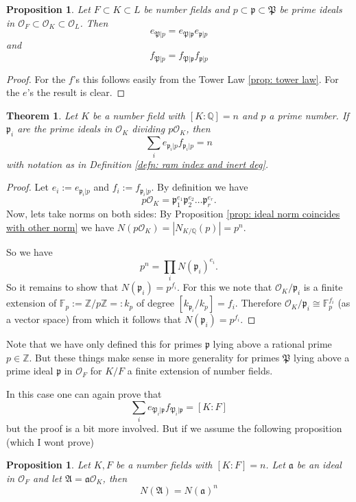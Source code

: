 \documentclass[11pt,a4paper]{report}
\theoremstyle{plain}
\newtheorem{thm}[subsection]{Theorem}
\newtheorem{prop}[subsection]{Proposition}
\theoremstyle{definition}
\theoremstyle{definition}
\newcommand{\ZZ}{\mathbb{Z}}
\def\FF{\mathbb{F}}
\def\QQ{\mathbb{Q}}
\def \gothP{\mathfrak{P}}
\def\gothp{\mathfrak{p}}
\def \OO {\mathcal{O}}
\def\gotha{\mathfrak{a}}
\begin{document}
\begin{prop}\label{prop: tow law for ram rel}
Let $F \subset K \subset L$ be number fields and $p \subset \gothp \subset \gothP$ be prime ideals in $\OO_F \subset \OO_K \subset \OO_L$. Then
\[e_{\gothP|p}=e_{\gothP|\gothp}e_{\gothp|p} \] and 	\[f_{\gothP|p}=f_{\gothP|\gothp}f_{\gothp|p} \]
\end{prop}

\begin{proof}
For the $f$'s this follows easily from the Tower Law \ref{prop: tower law}. For the $e$'s the result is clear.
\end{proof}

\begin{thm}\label{thm: ram-rel}
Let $K$ be a number field with $[K:\QQ]=n$ and $p$ a prime number. If $\gothp_i$ are the prime ideals in $\OO_K$ dividing $p\OO_K$, then \[\sum_i e_{\gothp_i|p}f_{\gothp_i|p}=n\] with notation as in Definition \ref{defn: ram index and inert deg}.
\end{thm}

\begin{proof}
Let $e_i:=e_{\gothp_i|p}$ and $f_i:=f_{\gothp_i|p}$. By definition we have \[p\OO_K=\gothp_1^{e_1}\gothp_2^{e_2}\dots\gothp_r^{e_r}.\] Now, lets take norms on both sides: By Proposition \ref{prop: ideal norm coincides with other norm} we have $N(p\OO_K)=|N_{K/\QQ}(p)|=p^n$.

So we have  \[p^n=\prod_i N(\gothp_i)^{e_i}.\] So it remains to show that $N(\gothp_i)=p^{f_i}$. For this we note that $\OO_K/\gothp_i$ is a finite extension of $\FF_p:=\ZZ/p\ZZ=:k_p$ of degree $[k_{\gothp_i}/k_p]=f_i$. Therefore $\OO_K/\gothp_i \cong \FF_p^{f_i}$ (as a vector space) from which it follows that  $N(\gothp_i)=p^{f_i}$. 
\end{proof}






Note that we have only defined this for primes $\gothp$ lying above a rational prime $p \in \ZZ$. But these things make sense in more generality for primes $\gothP$  lying above a prime ideal $\gothp$ in $\OO_F$ for $K/F$ a finite extension of number fields. 

In this case one can again prove that \begin{equation} \label{eqn: ram rel} \sum_i e_{\gothP_i|\gothp}f_{\gothP_i|\gothp}=[K:F] \end{equation} but the proof is a bit more involved. But if we assume the following proposition (which I wont prove)	
\begin{prop}\label{prop: ideal norm in tower}
Let $K,F$ be a number fields with $[K:F]=n$. Let $\mathfrak{a}$ be an ideal in $\OO_F$ and let $\mathfrak{A}=\gotha\OO_K$, then 
\[N(\mathfrak{A})=N(\gotha)^n\]
\end{prop}
\end{document}
